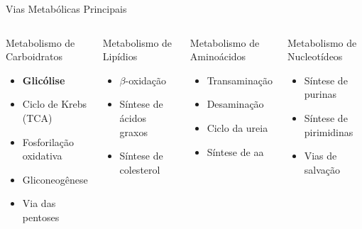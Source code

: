 \begin{frame}[allowframebreaks]{Vias Metabólicas Principais}
\begin{columns}
\begin{block}{Metabolismo de Carboidratos}
\begin{itemize}
    \item \textbf{Glicólise}
    \item Ciclo de Krebs (TCA)
    \item Fosforilação oxidativa
    \item Gliconeogênese
    \item Via das pentoses
\end{itemize}
\end{block}

\begin{block}{Metabolismo de Lipídios}
\begin{itemize}
    \item $\beta$-oxidação
    \item Síntese de ácidos graxos
    \item Síntese de colesterol
\end{itemize}
\end{block}

\begin{block}{Metabolismo de Aminoácidos}
\begin{itemize}
    \item Transaminação
    \item Desaminação
    \item Ciclo da ureia
    \item Síntese de aa
\end{itemize}
\end{block}

\begin{block}{Metabolismo de Nucleotídeos}
\begin{itemize}
    \item Síntese de purinas
    \item Síntese de pirimidinas
    \item Vias de salvação
\end{itemize}
\end{block}
\end{columns}
\end{frame}

